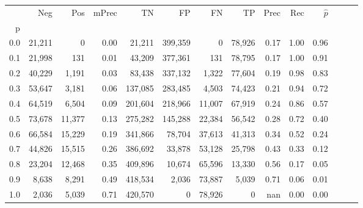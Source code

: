 \begin{tabular}{rrrrrrrrrrrrrr}
\toprule
{} &     Neg &     Pos & mPrec &       TN &       FP &      FN &      TP &  Prec &   Rec & $\hat{p}$ \\
p   &         &         &       &          &          &         &         &       &       &           \\
\midrule
0.0 &  21,211 &       0 &  0.00 &   21,211 &  399,359 &       0 &  78,926 &  0.17 &  1.00 &      0.96 \\
0.1 &  21,998 &     131 &  0.01 &   43,209 &  377,361 &     131 &  78,795 &  0.17 &  1.00 &      0.91 \\
0.2 &  40,229 &   1,191 &  0.03 &   83,438 &  337,132 &   1,322 &  77,604 &  0.19 &  0.98 &      0.83 \\
0.3 &  53,647 &   3,181 &  0.06 &  137,085 &  283,485 &   4,503 &  74,423 &  0.21 &  0.94 &      0.72 \\
0.4 &  64,519 &   6,504 &  0.09 &  201,604 &  218,966 &  11,007 &  67,919 &  0.24 &  0.86 &      0.57 \\
0.5 &  73,678 &  11,377 &  0.13 &  275,282 &  145,288 &  22,384 &  56,542 &  0.28 &  0.72 &      0.40 \\
0.6 &  66,584 &  15,229 &  0.19 &  341,866 &   78,704 &  37,613 &  41,313 &  0.34 &  0.52 &      0.24 \\
0.7 &  44,826 &  15,515 &  0.26 &  386,692 &   33,878 &  53,128 &  25,798 &  0.43 &  0.33 &      0.12 \\
0.8 &  23,204 &  12,468 &  0.35 &  409,896 &   10,674 &  65,596 &  13,330 &  0.56 &  0.17 &      0.05 \\
0.9 &   8,638 &   8,291 &  0.49 &  418,534 &    2,036 &  73,887 &   5,039 &  0.71 &  0.06 &      0.01 \\
1.0 &   2,036 &   5,039 &  0.71 &  420,570 &        0 &  78,926 &       0 &   nan &  0.00 &      0.00 \\
\bottomrule
\end{tabular}
